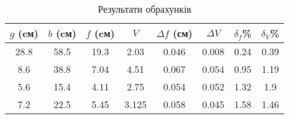 \begin{table}[h] \label{table:fV}
    \centering
    \begin{tabular}{ |c|c|c|c|c|c|c|c| }
        \hline 
        $g$ \textbf{(cм)} & $b$ \textbf{(cм)} & $f$ \textbf{(cм)} & $V$ & $\Delta f$ \textbf{(см)} & $\Delta V$ & $\delta_f$\% & $\delta_V$\% \\
        \hline
        28.8 & 58.5 & 19.3 & 2.03 & 0.046 & 0.008 & 0.24 & 0.39 \\
        \hline
        8.6 & 38.8 & 7.04 & 4.51 & 0.067 & 0.054 & 0.95 & 1.19 \\
        \hline
        5.6 & 15.4 & 4.11 & 2.75 & 0.054 & 0.052 & 1.32 & 1.9 \\
        \hline
        7.2 & 22.5 & 5.45 & 3.125 & 0.058 & 0.045 & 1.58 & 1.46 \\
        \hline
    \end{tabular}
    \caption{Результати обрахунків}
\end{table}

